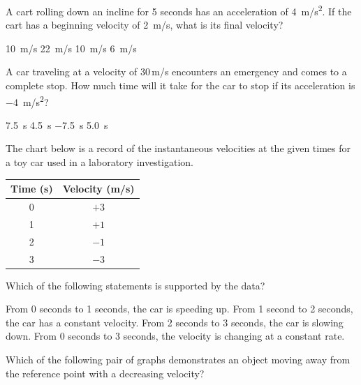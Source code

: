 \documentclass[answers]{exam}
\begin{document}
\begin{questions}


\question
A cart rolling down an incline for 5 seconds has an acceleration of \SI{4}{m/s^2}.  If the cart has a beginning velocity of \SI{2}{m/s}, what is its final velocity?

\begin{randomizechoices}
    \choice \SI{10}{m/s}
    \correctchoice \SI{22}{m/s}
    \choice \SI{10}{m/s}
    \choice \SI{6}{m/s}
\end{randomizechoices}

\question
A car traveling at a velocity of 30\,m/s encounters an emergency and comes to a complete stop.  How much time will it take for the car to stop if its acceleration is \SI{-4}{m/s^2}?

\begin{randomizechoices}
    \correctchoice \SI{7.5}{s}
    \choice \SI{4.5}{s}
    \choice \SI{-7.5}{s}
    \choice \SI{5.0}{s}
\end{randomizechoices}

\question
The chart below is a record of the instantaneous velocities at the given times for a toy car used in a laboratory investigation.

\begin{center}
    \begin{tabular}{c|c}
        \textbf{Time} (s) & \textbf{Velocity} (m/s) \\ \hline
        0 & $+3$ \\
        1 & $+1$ \\
        2 & $-1$ \\
        3 & $-3$ \\
    \end{tabular}
\end{center}

Which of the following statements is supported by the data?

\begin{randomizechoices}
    \choice From 0 seconds to 1 seconds, the car is speeding up.
    \choice From 1 second to 2 seconds, the car has a constant velocity. 
    \choice From 2 seconds to 3 seconds, the car is slowing down.
    \correctchoice From 0 seconds to 3 seconds, the velocity is changing at a constant rate.
\end{randomizechoices}

\question
Which of the following pair of graphs demonstrates an object moving away from the reference point with a decreasing velocity?


\end{questions}
\end{document}
